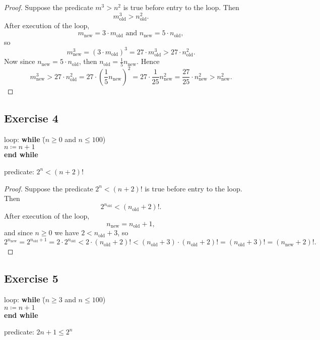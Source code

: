 \documentclass[14pt]{extarticle}
\begin{document}
\begin{proof}
    Suppose the predicate $m^3 > n^2$ is true before entry to the loop. Then
    \[
        m_{\text{old}}^3 > n_{\text{old}}^2.
    \]
    After execution of the loop,
    \[
        m_{\text{new}} = 3 \cdot m_{\text{old}} \text{ and }
        n_{\text{new}} = 5 \cdot n_{\text{old}},
    \]
    so
    \[
        m_{\text{new}}^3 = (3 \cdot m_{\text{old}})^3 = 27 \cdot m_{\text{old}}^3 > 27 \cdot n_{\text{old}}^2.
    \]
    Now since $n_{\text{new}} = 5 \cdot n_{\text{old}}$, then
    \(n_{\text{old}} = \frac{1}{5}n_{\text{new}}.\)
    Hence
    \[
        m_{\text{new}}^3 > 27 \cdot n_{\text{old}}^2 = 27 \cdot
        \left(\frac{1}{5}n_{\text{new}}\right)^2 = 27 \cdot \frac{1}{25}
        n_{\text{new}}^2 = \frac{27}{25} \cdot n_{\text{new}}^2 > n_{\text{new}}^2.
    \]
\end{proof}

\subsection{Exercise 4}
\begin{tabbing}
    loop: \hspace{1cm}
    \= {\bf while} \= ($n \geq 0$ and $n \leq 100$) \\
    \>             \> $n \coloneqq n + 1$ \\
    \> {\bf end while}
\end{tabbing}
predicate: $2^n < (n+2)!$

\begin{proof}
    Suppose the predicate $2^n < (n+2)!$ is true before entry to the loop. Then
    \[
        2^{n_{\text{old}}} < (n_{\text{old}} + 2)!.
    \]
    After execution of the loop,
    \[
        n_{\text{new}} = n_{\text{old}} + 1,
    \]
    and since $n \geq 0$ we have $2 < n_{\text{old}} + 3$, so
    \[
        2^{n_{\text{new}}} = 2^{n_{\text{old}} + 1} = 2 \cdot 2^{n_{\text{old}}} < 2 \cdot (n_{\text{old}} + 2)! < (n_{\text{old}} + 3) \cdot (n_{\text{old}} + 2)! = (n_{\text{old}} + 3)! = (n_{\text{new}} + 2)!.
    \]
\end{proof}

\subsection{Exercise 5}
\begin{tabbing}
    loop: \hspace{1cm}
    \= {\bf while} \= ($n \geq 3$ and $n \leq 100$) \\
    \>             \> $n \coloneqq n + 1$ \\
    \> {\bf end while}
\end{tabbing}
predicate: $2n + 1 \leq 2^n$
\end{document}
